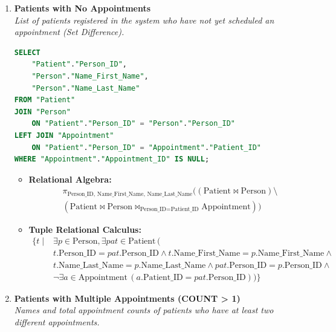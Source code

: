 \documentclass[12pt,a4paper]{article}
\begin{document}
\begin{enumerate}

	\item \textbf{Patients with No Appointments} \\
	      \textit{List of patients registered in the system who have not yet scheduled an appointment (Set Difference).}

	      \begin{lstlisting}[language=SQL, caption=Query: Patients with No Appointments, basicstyle=\ttfamily\footnotesize, breaklines=true]
SELECT 
    "Patient"."Person_ID",
    "Person"."Name_First_Name",
    "Person"."Name_Last_Name"
FROM "Patient"
JOIN "Person"
    ON "Patient"."Person_ID" = "Person"."Person_ID"
LEFT JOIN "Appointment"
    ON "Patient"."Person_ID" = "Appointment"."Patient_ID"
WHERE "Appointment"."Appointment_ID" IS NULL;
\end{lstlisting}
	      \begin{itemize}
		      \item \textbf{Relational Algebra:}
		            $$ \begin{aligned} & \pi_{\text{Person\_ID, Name\_First\_Name, Name\_Last\_Name}} ((\text{Patient} \bowtie \text{Person}) \setminus \\ & (\text{Patient} \bowtie \text{Person} \bowtie_{\text{Person\_ID}=\text{Patient\_ID}} \text{Appointment})) \end{aligned} $$
		      \item \textbf{Tuple Relational Calculus:}
		            $$ \begin{aligned} \{ t \mid & \exists p \in \text{Person}, \exists pat \in \text{Patient} \, ( \\ & t.\text{Person\_ID} = pat.\text{Person\_ID} \land t.\text{Name\_First\_Name} = p.\text{Name\_First\_Name} \land \\ & t.\text{Name\_Last\_Name} = p.\text{Name\_Last\_Name} \land pat.\text{Person\_ID} = p.\text{Person\_ID} \land \\ & \neg \exists a \in \text{Appointment} \, (a.\text{Patient\_ID} = pat.\text{Person\_ID})) \} \end{aligned} $$
	      \end{itemize}

	\item \textbf{Patients with Multiple Appointments (COUNT > 1)} \\
	      \textit{Names and total appointment counts of patients who have at least two different appointments.}


\end{enumerate}
\end{document}
